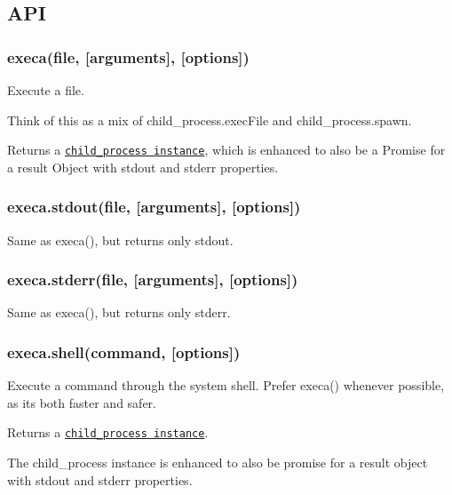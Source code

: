 \subsection*{A\+PI}

\subsubsection*{execa(file, \mbox{[}arguments\mbox{]}, \mbox{[}options\mbox{]})}

Execute a file.

Think of this as a mix of {\ttfamily child\+\_\+process.\+exec\+File} and {\ttfamily child\+\_\+process.\+spawn}.

Returns a \href{https://nodejs.org/api/child_process.html#child_process_class_childprocess}{\tt {\ttfamily child\+\_\+process} instance}, which is enhanced to also be a {\ttfamily Promise} for a result {\ttfamily Object} with {\ttfamily stdout} and {\ttfamily stderr} properties.

\subsubsection*{execa.\+stdout(file, \mbox{[}arguments\mbox{]}, \mbox{[}options\mbox{]})}

Same as {\ttfamily execa()}, but returns only {\ttfamily stdout}.

\subsubsection*{execa.\+stderr(file, \mbox{[}arguments\mbox{]}, \mbox{[}options\mbox{]})}

Same as {\ttfamily execa()}, but returns only {\ttfamily stderr}.

\subsubsection*{execa.\+shell(command, \mbox{[}options\mbox{]})}

Execute a command through the system shell. Prefer {\ttfamily execa()} whenever possible, as it\textquotesingle{}s both faster and safer.

Returns a \href{https://nodejs.org/api/child_process.html#child_process_class_childprocess}{\tt {\ttfamily child\+\_\+process} instance}.

The {\ttfamily child\+\_\+process} instance is enhanced to also be promise for a result object with {\ttfamily stdout} and {\ttfamily stderr} properties.

